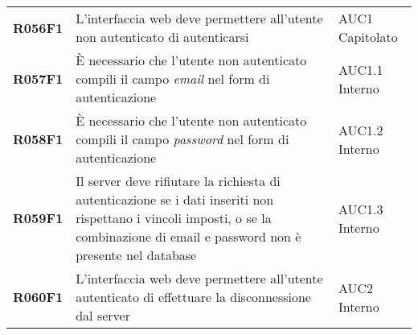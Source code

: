 \documentclass[../analisi-dei-requisiti.tex]{subfiles}
\begin{document}
\begin{longtable}[H]{>{\centering\bfseries}m{3cm} >{\centering}m{10cm} >{\centering\arraybackslash}m{3cm}}
  R056F1                               & L'interfaccia web deve permettere all'utente non autenticato di autenticarsi                                                                                                                            & AUC1 Capitolato               \\
  R057F1                               & È necessario che l'utente non autenticato compili il campo \textit{email} nel form di autenticazione                                                                                                    & AUC1.1 Interno                \\
  R058F1                               & È necessario che l'utente non autenticato compili il campo \textit{password} nel form di autenticazione                                                                                                 & AUC1.2 Interno                \\
  R059F1                               & Il server deve rifiutare la richiesta di autenticazione se i dati inseriti non rispettano i vincoli imposti, o se la combinazione di email e password non è presente nel database                       & AUC1.3 Interno                \\
  R060F1                               & L'interfaccia web deve permettere all'utente autenticato di effettuare la disconnessione dal server                                                                                                     & AUC2 Interno                  \\


\end{longtable}
\end{document}
